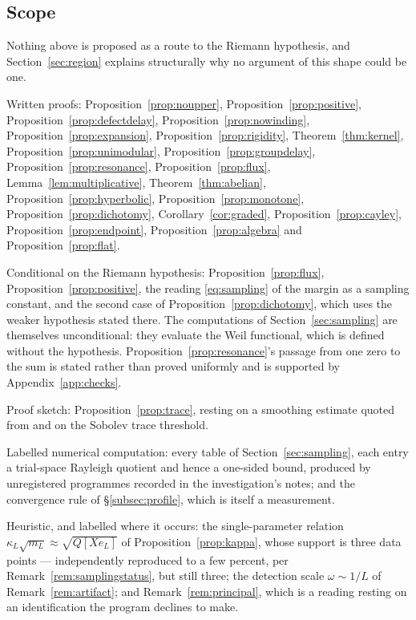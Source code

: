 \subsection{Scope}

Nothing above is proposed as a route to the Riemann hypothesis, and
Section~\ref{sec:region} explains structurally why no argument of this shape could
be one.

Written proofs: Proposition~\ref{prop:noupper}, Proposition~\ref{prop:positive},
Proposition~\ref{prop:defectdelay}, Proposition~\ref{prop:nowinding},
Proposition~\ref{prop:expansion}, Proposition~\ref{prop:rigidity},
Theorem~\ref{thm:kernel}, Proposition~\ref{prop:unimodular},
Proposition~\ref{prop:groupdelay}, Proposition~\ref{prop:resonance},
Proposition~\ref{prop:flux}, Lemma~\ref{lem:multiplicative},
Theorem~\ref{thm:abelian}, Proposition~\ref{prop:hyperbolic},
Proposition~\ref{prop:monotone}, Proposition~\ref{prop:dichotomy},
Corollary~\ref{cor:graded}, Proposition~\ref{prop:cayley},
Proposition~\ref{prop:endpoint}, Proposition~\ref{prop:algebra} and
Proposition~\ref{prop:flat}.

Conditional on the Riemann hypothesis: Proposition~\ref{prop:flux},
Proposition~\ref{prop:positive}, the reading \eqref{eq:sampling} of the margin as
a sampling constant, and the second case of Proposition~\ref{prop:dichotomy},
which uses the weaker hypothesis stated there. The computations of
Section~\ref{sec:sampling} are themselves unconditional: they evaluate the Weil
functional, which is defined without the hypothesis. Proposition~\ref{prop:resonance}'s passage from one zero to the sum is
stated rather than proved uniformly and is supported by
Appendix~\ref{app:checks}.

Proof sketch: Proposition~\ref{prop:trace}, resting on a smoothing estimate
quoted from \cite{Background} and on the Sobolev trace threshold.

Labelled numerical computation: every table of Section~\ref{sec:sampling}, each
entry a trial-space Rayleigh quotient and hence a one-sided bound, produced by
unregistered programmes recorded in the investigation's notes; and the
convergence rule of \S\ref{subsec:profile}, which is itself a measurement.

Heuristic, and labelled where it occurs: the single-parameter relation
$\kappa_L\sqrt{m_L}\approx\sqrt{Q[Xe_L]}$ of Proposition~\ref{prop:kappa}, whose
support is three data points --- independently reproduced to a few percent, per
Remark~\ref{rem:samplingstatus}, but still three; the detection scale $\omega\sim1/L$ of
Remark~\ref{rem:artifact}; and Remark~\ref{rem:principal}, which is a reading
resting on an identification the program declines to make.

